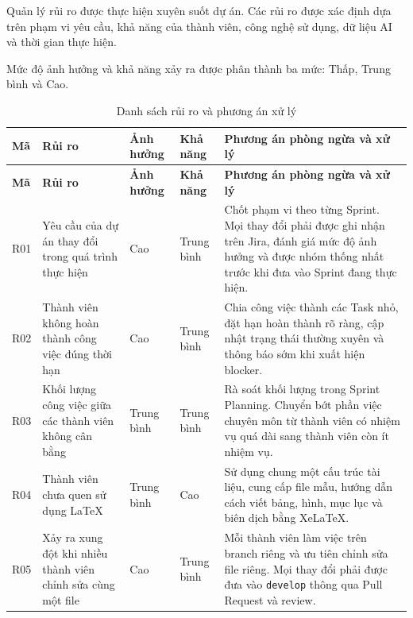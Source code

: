 Quản lý rủi ro được thực hiện xuyên suốt dự án. Các rủi ro được xác định
dựa trên phạm vi yêu cầu, khả năng của thành viên, công nghệ sử dụng,
dữ liệu AI và thời gian thực hiện.

Mức độ ảnh hưởng và khả năng xảy ra được phân thành ba mức: Thấp,
Trung bình và Cao.

\renewcommand{\arraystretch}{1.25}

\begin{longtable}{
		|>{\centering\arraybackslash}p{1.1cm}
		|p{3.3cm}
		|>{\centering\arraybackslash}p{1.8cm}
		|>{\centering\arraybackslash}p{2.0cm}
		|p{5.2cm}|
	}
	\caption{Danh sách rủi ro và phương án xử lý}
	\label{tab:project-risks}\\
	\hline
	\textbf{Mã} &
	\textbf{Rủi ro} &
	\textbf{Ảnh hưởng} &
	\textbf{Khả năng} &
	\textbf{Phương án phòng ngừa và xử lý} \\
	\hline
	\endfirsthead
	
	\hline
	\textbf{Mã} &
	\textbf{Rủi ro} &
	\textbf{Ảnh hưởng} &
	\textbf{Khả năng} &
	\textbf{Phương án phòng ngừa và xử lý} \\
	\hline
	\endhead
	
	R01 &
	Yêu cầu của dự án thay đổi trong quá trình thực hiện &
	Cao &
	Trung bình &
	Chốt phạm vi theo từng Sprint. Mọi thay đổi phải được ghi nhận trên
	Jira, đánh giá mức độ ảnh hưởng và được nhóm thống nhất trước khi đưa
	vào Sprint đang thực hiện. \\
	\hline
	
	R02 &
	Thành viên không hoàn thành công việc đúng thời hạn &
	Cao &
	Trung bình &
	Chia công việc thành các Task nhỏ, đặt hạn hoàn thành rõ ràng, cập nhật
	trạng thái thường xuyên và thông báo sớm khi xuất hiện blocker. \\
	\hline
	
	R03 &
	Khối lượng công việc giữa các thành viên không cân bằng &
	Trung bình &
	Trung bình &
	Rà soát khối lượng trong Sprint Planning. Chuyển bớt phần việc chuyên môn
	từ thành viên có nhiệm vụ quá dài sang thành viên còn ít nhiệm vụ. \\
	\hline
	
	R04 &
	Thành viên chưa quen sử dụng LaTeX &
	Trung bình &
	Cao &
	Sử dụng chung một cấu trúc tài liệu, cung cấp file mẫu, hướng dẫn cách
	viết bảng, hình, mục lục và biên dịch bằng XeLaTeX. \\
	\hline
	
	R05 &
	Xảy ra xung đột khi nhiều thành viên chỉnh sửa cùng một file &
	Cao &
	Trung bình &
	Mỗi thành viên làm việc trên branch riêng và ưu tiên chỉnh sửa file
	riêng. Mọi thay đổi phải được đưa vào \texttt{develop} thông qua Pull
	Request và review. \\
	\hline
	

\end{longtable}
